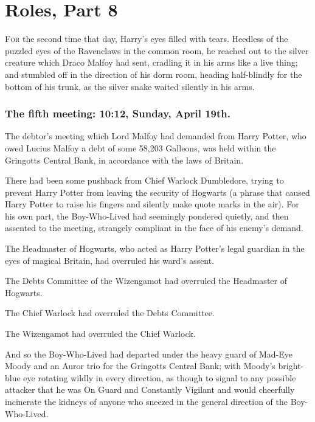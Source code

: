 \chapter{Roles, Part 8}


\lettrine{F}{or} the second
time that day, Harry's eyes filled with tears. Heedless of the puzzled eyes of
the Ravenclaws in the common room, he reached out to the silver creature which
Draco Malfoy had sent, cradling it in his arms like a live thing; and stumbled
off in the direction of his dorm room, heading half-blindly for the bottom of
his trunk, as the silver snake waited silently in his arms.
\sbreak
\vspace{-2\baselineskip}
\subsection{The fifth meeting: 10:12\AM, Sunday, April 19th.}

The debtor's meeting which Lord Malfoy had demanded from Harry Potter, who owed
Lucius Malfoy a debt of some 58,203 Galleons, was held within the Gringotts
Central Bank, in accordance with the laws of Britain.

There had been some pushback from Chief Warlock Dumbledore, trying to prevent
Harry Potter from leaving the security of Hogwarts (a phrase that caused Harry
Potter to raise his fingers and silently make quote marks in the air). For his
own part, the Boy-Who-Lived had seemingly pondered quietly, and then assented
to the meeting, strangely compliant in the face of his enemy's demand.

The Headmaster of Hogwarts, who acted as Harry Potter's legal guardian in the
eyes of magical Britain, had overruled his ward's assent.

The Debts Committee of the Wizengamot had overruled the Headmaster of Hogwarts.

The Chief Warlock had overruled the Debts Committee.

The Wizengamot had overruled the Chief Warlock.

And so the Boy-Who-Lived had departed under the heavy guard of Mad-Eye Moody
and an Auror trio for the Gringotts Central Bank; with Moody's bright-blue eye
rotating wildly in every direction, as though to signal to any possible
attacker that he was On Guard and Constantly Vigilant and would cheerfully
incinerate the kidneys of anyone who sneezed in the general direction of the
Boy-Who-Lived.

